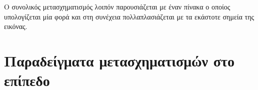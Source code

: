 Ο συνολικός μετασχηματισμός λοιπόν παρουσιάζεται με έναν πίνακα ο οποίος υπολογίζεται μία φορά και στη συνέχεια πολλαπλασιάζεται με τα εκάστοτε σημεία της εικόνας.

\section{Παραδείγματα μετασχηματισμών στο επίπεδο}











